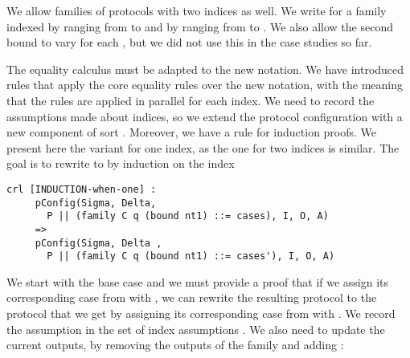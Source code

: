 We allow families of protocols with two indices as well. 
We write 
for a family indexed by  ranging from  to
 and by  ranging from  to
. We also allow the second bound to vary for each ,
but we did not use this in the case studies so far.

The equality calculus must be adapted to the new notation. We
have introduced rules that apply the core equality rules over the new
notation, with the meaning that the rules are applied in parallel for
each index.
We need to record the assumptions made about indices, so we extend
the protocol configuration with a new component of sort
.
 Moreover, we have a rule for induction proofs. 
We present here the variant for one index, 
as the one for two indices is similar.
The goal is to rewrite
to 
by induction on the index
\begin{lstlisting}
crl [INDUCTION-when-one] :
     pConfig(Sigma, Delta, 
       P || (family C q (bound nt1) ::= cases), I, O, A)
     =>
     pConfig(Sigma, Delta , 
       P || (family C q (bound nt1) ::= cases'), I, O, A)
\end{lstlisting} 
We start with the base case and we must provide a proof that
if we assign  its corresponding case from 
with , we can rewrite the resulting protocol to the protocol
that we get by assigning  its corresponding case from  with . We record the assumption  in
the set of index assumptions 
. We also need to update the current outputs, by removing the outputs of the family  and adding :
      
